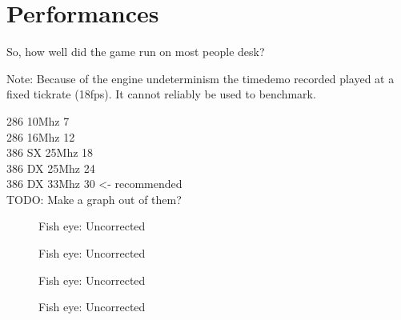 \section{Performances}
So, how well did the game run on most people desk?

Note: Because of the engine undeterminism the timedemo recorded played at a fixed tickrate (18fps). It cannot reliably be used to benchmark.

286 10Mhz 7 \\
286 16Mhz 12 \\
386 SX 25Mhz  18 \\
386 DX 25Mhz 24 \\
386 DX 33Mhz 30 <- recommended \\

TODO: Make a graph out of them?

  \begin{figure}[H]
\centering
  \caption{Fish eye: Uncorrected} 
 \end{figure}
 \par

   \begin{figure}[H]
\centering
  \caption{Fish eye: Uncorrected} 
 \end{figure}
 \par

   \begin{figure}[H]
\centering
  \caption{Fish eye: Uncorrected} 
 \end{figure}
 \par


    \begin{figure}[H]
\centering
  \caption{Fish eye: Uncorrected} 
 \end{figure}
 \par